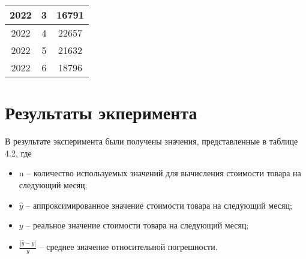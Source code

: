 \documentclass{bmstu}
\begin{document}
\begin{table}[H]
\begin{center}
\begin{tabular}{| c | c | c |}
			\hline
			
			2022 & 3 & 16791 \\
			
			\hline
			
			2022 & 4 & 22657 \\
			
			\hline
			
			2022 & 5 & 21632 \\
			
			\hline
			
			2022 & 6 & 18796 \\
			
			\hline
		\end{tabular}
	\end{center}
\end{table}

\section{Результаты экперимента}

В результате эксперимента были получены значения, представленные в таблице 4.2, где

\begin{itemize}
	\item n -- количество используемых значений для вычисления стоимости товара на следующий месяц;
	\item $\hat{y}$ -- аппроксимированное значение стоимости товара на следующий месяц;
	\item $y$ -- реальное значение стоимости товара на следующий месяц;
	\item $\frac{|\hat{y} - y|}{y}$ -- среднее значение относительной погрешности.
\end{itemize}
\end{document}
